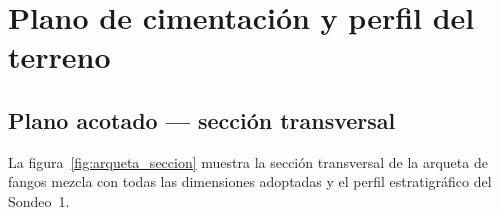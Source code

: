 \section{Plano de cimentación y perfil del terreno}
\label{sec:arqueta_cimentacion}

\subsection{Plano acotado --- sección transversal}
\label{subsec:arqueta_seccion}

La figura~\ref{fig:arqueta_seccion} muestra la sección transversal de la
arqueta de fangos mezcla con todas las dimensiones adoptadas y el perfil
estratigráfico del Sondeo~1.

